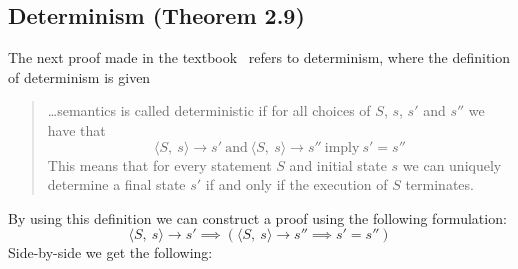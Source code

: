 %
%
\subsection{Determinism (Theorem 2.9)}
\label{formal_ns_sos_equiv:sec:ns:determinism}
The next proof made in the textbook~\citep[p.~29]{nielson_semantics_2007} refers to determinism,
where the definition of determinism is given
\begin{quotation}
\dots semantics is called deterministic if for all choices of
\(S\), \(s\), \(s'\) and \(s''\) we have that
\[
\langle S,\ s \rangle \to s'\ \mbox{and}\ \langle S,\ s \rangle \to s''\ \mbox{imply}\ s' = s''
\]
This means that for every statement \(S\) and initial state \(s\) we can uniquely
determine a final state \(s'\) if and only if the execution of \(S\) terminates.
\end{quotation}
By using this definition we can construct a proof using the following formulation:
\[
\langle S,\ s \rangle \to s' \implies \left(\langle S,\ s \rangle \to s'' \implies s' = s''\right)
\]
Side-by-side we get the following:
\vspace{1em}
